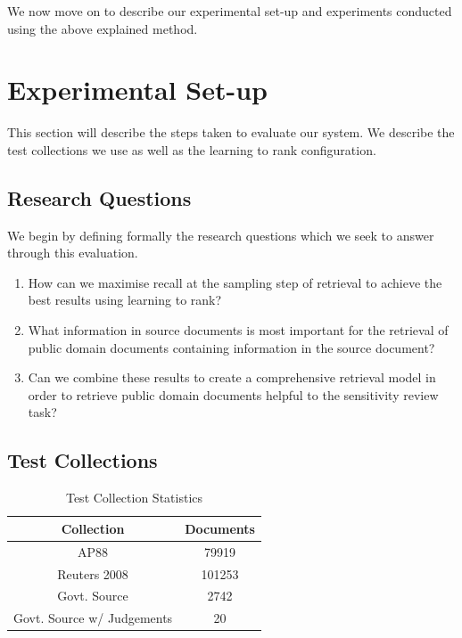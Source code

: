 \documentclass{mpaper}
\begin{document}
We now move on to describe our experimental set-up and experiments conducted using the above explained method.

\section{Experimental Set-up} \label{sec:setup}
This section will describe the steps taken to evaluate our system. We describe the test collections we use as well as the learning to rank configuration.

\subsection{Research Questions}
We begin by defining formally the research questions which we seek to answer through this evaluation.
\begin{enumerate}[label=\textbf{RQ.\arabic*}]
\item How can we maximise recall at the sampling step of retrieval to achieve the best results using learning to rank?

\item What information in source documents is most important for the retrieval of public domain documents containing information in the source document?

\item Can we combine these results to create a comprehensive retrieval model in order to retrieve public domain documents helpful to the sensitivity review task?
\end{enumerate}

\subsection{Test Collections}
\begin{center}
\begin{table}[H]
\centering
\begin{tabular}{|c|c|}
\hline
Collection	 	& Documents 		\\ \hline
AP88			& 79919				\\
Reuters 2008	& 101253			\\
Govt. Source 	& 2742				\\
Govt. Source w/ Judgements & 20	\\ \hline
\end{tabular}
\caption{Test Collection Statistics}
\label{table:statistics}
\end{table}
\end{center}
\end{document}
